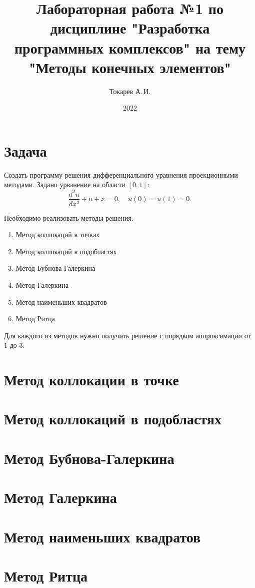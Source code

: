 \documentclass[12pt,a4paper]{article}
\title{Лабораторная работа №1 по дисциплине "Разработка программных комплексов" на тему "Методы конечных элементов"}
\author{Токарев А.\,И.}
\date{2022}
\begin{document}
    \maketitle
    \tableofcontents
    \pagebreak

    \section{Задача}

    Создать программу решения дифференциального уравнения проекционными методами. Задано урванение на области $[0, 1]\colon$
    \[
        \dfrac{d^2 u}{dx^2} + u + x = 0, \quad u(0) = u(1) = 0.
    \]  

    Необходимо реализовать методы решения:
    \begin{enumerate}
        \item Метод коллокаций в точках
        \item Метод коллокаций в подобластях
        \item Метод Бубнова-Галеркина
        \item Метод Галеркина
        \item Метод наименьших квадратов
        \item Метод Ритца
    \end{enumerate}

    Для каждого из методов нужно получить решение с порядком аппроксимации от $1$ до $3$.

    \pagebreak

    \section{Метод коллокации в точке}

    \pagebreak

    \section{Метод коллокаций в подобластях}

    \pagebreak

    \section{ Метод Бубнова-Галеркина}

    \pagebreak

    \section{ Метод Галеркина}

    \pagebreak

    \section{Метод наименьших квадратов}

    \pagebreak

    \section{Метод Ритца}
\end{document}
